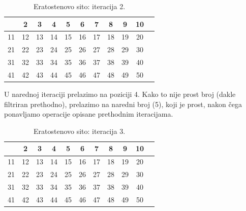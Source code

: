 \begin{table}[H]
	\centering
	\begin{tabular}{|c|c|c|c|c|c|c|c|c|c|c} \hline
	& 2 & 3 & \cellcolor{red!30}  4 & 5 & \cellcolor{red!30} 6 & 7 & \cellcolor{red!30} 8 & \cellcolor{red!70} 9 & \cellcolor{red!30} 10 \\ \hline
	11 &\cellcolor{red!30}  12 & 13 & \cellcolor{red!30} 14 & \cellcolor{red!70} 15 & \cellcolor{red!30} 16 & 17 & \cellcolor{red!30} \cellcolor{red!30} 18 & 19 & \cellcolor{red!30} \cellcolor{red!30} 20 \\ \hline
	\cellcolor{red!70} 21 & \cellcolor{red!30} 22 & 23 & \cellcolor{red!30} 24 & 25 & \cellcolor{red!30} 26 & \cellcolor{red!70}  27 &\cellcolor{red!30}  28 & 29 & \cellcolor{red!30} \cellcolor{red!30} 30 \\ \hline
	31 & \cellcolor{red!30} 32 & \cellcolor{red!70} 33 & \cellcolor{red!30} 34 & 35 & \cellcolor{red!30} 36 & 37 & \cellcolor{red!30} 38 &  \cellcolor{red!70}   39 & \cellcolor{red!30} 40 \\ \hline
	41 & \cellcolor{red!30} 42 & 43 & \cellcolor{red!30} 44 & \cellcolor{red!70} 45 & \cellcolor{red!30} 46 & 47 &\cellcolor{red!30}  48 & 49 &\cellcolor{red!30}  50 \\ \hline     
\end{tabular}
        \caption{Eratostenovo sito: iteracija 2.} \label{eratosten-sieve-it-2}
\end{table}

U narednoj iteraciji prelazimo na poziciji 4. Kako to nije prost broj (dakle filtriran prethodno), prelazimo na naredni broj (5), koji je prost, nakon čega ponavljamo operacije opisane prethodnim iteracijama. 


\begin{table}[H]
	\centering
	\begin{tabular}{|c|c|c|c|c|c|c|c|c|c|c} \hline
		& 2 & 3 & \cellcolor{red!30}  4 & 5 & \cellcolor{red!30} 6 & 7 & \cellcolor{red!30} 8 & \cellcolor{red!30} 9 & \cellcolor{red!30} 10 \\ \hline
		11 &\cellcolor{red!30}  12 & 13 & \cellcolor{red!30} 14 & \cellcolor{red!30} 15 & \cellcolor{red!30} 16 & 17 & \cellcolor{red!30} \cellcolor{red!30} 18 & 19 & \cellcolor{red!30} \cellcolor{red!30} 20 \\ \hline
		\cellcolor{red!30} 21 & \cellcolor{red!30} 22 & 23 & \cellcolor{red!30} 24 & \cellcolor{red!90} 25 & \cellcolor{red!30} 26 & \cellcolor{red!30}  27 &\cellcolor{red!30}  28 & 29 & \cellcolor{red!30} \cellcolor{red!30} 30 \\ \hline
		31 & \cellcolor{red!30} 32 & \cellcolor{red!30} 33 & \cellcolor{red!30} 34 & \cellcolor{red!90} 35 & \cellcolor{red!30} 36 & 37 & \cellcolor{red!30} 38 & \cellcolor{red!30} 39 & \cellcolor{red!30} 40 \\ \hline
		41 & \cellcolor{red!30} 42 & 43 & \cellcolor{red!30} 44 & \cellcolor{red!30} 45 & \cellcolor{red!30} 46 & 47 &\cellcolor{red!30}  48 & 49 &\cellcolor{red!30}  50 \\ \hline     
	\end{tabular}
	\caption{Eratostenovo sito: iteracija 3.} \label{eratosten-sieve-it-3}
\end{table}

